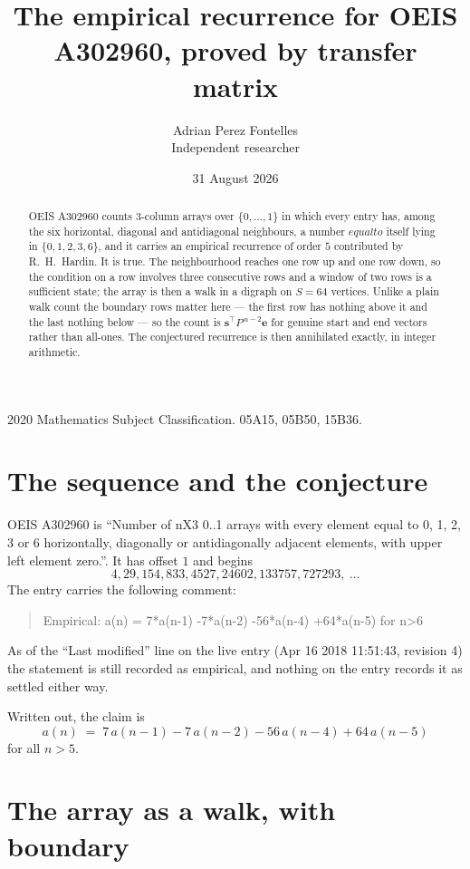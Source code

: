 \documentclass[11pt,a4paper]{article}
\title{The empirical recurrence for OEIS A302960, proved by transfer matrix}
\author{Adrian Perez Fontelles\\ \small Independent researcher}
\date{31 August 2026}
\theoremstyle{plain}
\theoremstyle{definition}
\begin{document}
\maketitle

\begin{abstract}
OEIS A302960 counts $3$-column arrays over $\{0,\dots,1\}$ in which every entry has,
among the six horizontal, diagonal and antidiagonal neighbours, a number $equal to$ itself lying in $\{0,1,2,3,6\}$, and it carries an empirical
recurrence of order $5$ contributed by R.~H.~Hardin. It is true. The neighbourhood
reaches one row up and one row down, so the condition on a row involves three consecutive
rows and a window of two rows is a sufficient state; the array is then a walk in a digraph
on $S=64$ vertices. Unlike a plain walk count the boundary rows matter here --- the first
row has nothing above it and the last nothing below --- so the count is
$\mathbf{s}^{\!\top}P^{\,n-2}\mathbf{e}$ for genuine start and end vectors rather than
all-ones. The conjectured recurrence is then annihilated exactly, in integer arithmetic.
\end{abstract}

\noindent\small 2020 Mathematics Subject Classification. 05A15, 05B50, 15B36.\normalsize

\section{The sequence and the conjecture}

OEIS A302960 is ``Number of nX3 0..1 arrays with every element equal to 0, 1, 2, 3 or 6 horizontally, diagonally or antidiagonally adjacent elements, with upper left element zero.''. It has offset
$1$ and begins
\[
4, 29, 154, 833, 4527, 24602, 133757, 727293,\ \dots
\]
The entry carries the following comment:
\begin{quote}\small
Empirical: a(n) = 7*a(n-1) -7*a(n-2) -56*a(n-4) +64*a(n-5) for n>6
\end{quote}
As of the ``Last modified'' line on the live entry (Apr 16 2018 11:51:43, revision
4) the statement is still recorded as empirical, and nothing on the entry
records it as settled either way.

Written out, the claim is
\begin{equation}\label{eq:conj}
a(n)\;=\;7\,a(n-1) - 7\,a(n-2) - 56\,a(n-4) + 64\,a(n-5)
\end{equation}
for all $n>5$.

\section{The array as a walk, with boundary}
\end{document}
